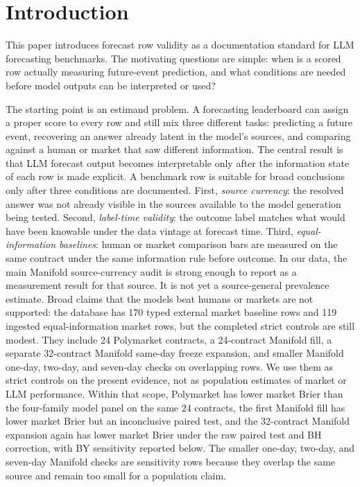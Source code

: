 \documentclass[11pt]{article}
\begin{document}
\begin{abstract}
effective-denominator audit; and a companion benchmark design that scores row validity, equal-information comparison, calibration, relative judgment, intervention, choosing among model families, open model replication, and public low-overlap replication as separate tracks.
\end{abstract}

\section{Introduction}

This paper introduces forecast row validity as a documentation standard for LLM forecasting benchmarks. The motivating questions are simple: when is a scored row actually measuring future-event prediction, and what conditions are needed before model outputs can be interpreted or used?

The starting point is an estimand problem. A forecasting leaderboard can assign a proper score to every row and still mix three different tasks: predicting a future event, recovering an answer already latent in the model's sources, and comparing against a human or market that saw different information. The central result is that LLM forecast output becomes interpretable only after the information state of each row is made explicit. A benchmark row is suitable for broad conclusions only after three conditions are documented. First, \emph{source currency}: the resolved answer was not already visible in the sources available to the model generation being tested. Second, \emph{label-time validity}: the outcome label matches what would have been knowable under the data vintage at forecast time. Third, \emph{equal-information baselines}: human or market comparison bars are measured on the same contract under the same information rule before outcome. In our data, the main Manifold source-currency audit is strong enough to report as a measurement result for that source. It is not yet a source-general prevalence estimate. Broad claims that the models beat humans or markets are not supported: the database has 170 typed external market baseline rows and 119 ingested equal-information market rows, but the completed strict controls are still modest. They include 24 Polymarket contracts, a 24-contract Manifold fill, a separate 32-contract Manifold same-day freeze expansion, and smaller Manifold one-day, two-day, and seven-day checks on overlapping rows. We use them as strict controls on the present evidence, not as population estimates of market or LLM performance. Within that scope, Polymarket has lower market Brier than the four-family model panel on the same 24 contracts, the first Manifold fill has lower market Brier but an inconclusive paired test, and the 32-contract Manifold expansion again has lower market Brier under the raw paired test and BH correction, with BY sensitivity reported below. The smaller one-day, two-day, and seven-day Manifold checks are sensitivity rows because they overlap the same source and remain too small for a population claim.
\end{document}

